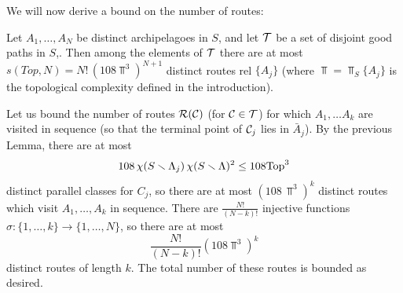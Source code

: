 
\msk
We will now derive a bound on the number of routes: 
 
\begin{lem}\label{route count} 
Let $A_1, \ldots, A_N$ be distinct archipelagoes in $S$,
and let ${\cal T}$ be a set of disjoint good paths in $S$,.
Then among the elements of ${\cal T}$ there are at most $s(Top, N) = N!\, (108\Top^3)^{N+1}$ 
distinct routes rel $\{ A_j\}$
(where $\Top = \Top_S\{A_j\}$ is the topological complexity defined in the introduction).
\end{lem}
%
\begin{pf}
{
  \def\NN{\frac{N!}{(N-k)!}}
  Let us bound the number of routes ${\cal R}({\cal C})$ (for ${\cal C} \in {\cal T}$) 
  for which $A_1, \ldots A_k$ are visited in sequence
  (so that the terminal point of ${\cal C}_j$ lies in $\bar A_j$).
  By the previous Lemma, 
  there are at most 
  $$
  108\, \chi(S \smallsetminus {\Lambda}_j)\, \chi(S \smallsetminus {\Lambda})^2  \le 108{\mathrm{Top}}^3
  $$
  distinct parallel classes for $C_j$,
  so there are at most 
  $(108\, \Top^3)^k$
  distinct routes which visit $A_1, \ldots, A_k$ in sequence.
  There are $\NN$ injective functions 
  $\sigma: \{1, \ldots, k\} \to \{1, \ldots, N\}$, 
  so there are at most 
  $$\NN(108\Top^3)^k$$
  distinct routes of length $k$. 
The total number of these routes is bounded as desired.
}
\end{pf}

